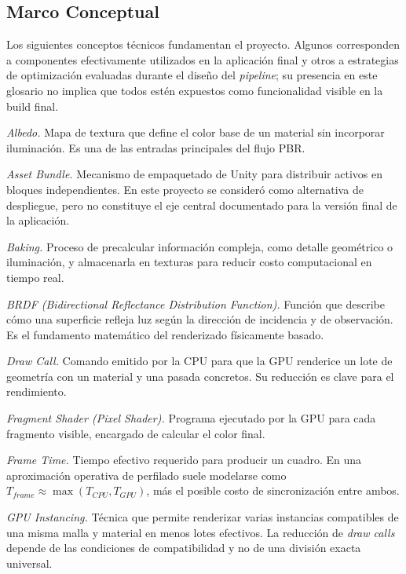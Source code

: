 \subsection{Marco Conceptual}

Los siguientes conceptos t\'ecnicos fundamentan el proyecto. Algunos corresponden a componentes efectivamente utilizados en la aplicaci\'on final y otros a estrategias de optimizaci\'on evaluadas durante el dise\~no del \textit{pipeline}; su presencia en este glosario no implica que todos est\'en expuestos como funcionalidad visible en la build final.

\textit{Albedo.} Mapa de textura que define el color base de un material sin incorporar iluminaci\'on. Es una de las entradas principales del flujo PBR.

\textit{Asset Bundle.} Mecanismo de empaquetado de Unity para distribuir activos en bloques independientes. En este proyecto se consider\'o como alternativa de despliegue, pero no constituye el eje central documentado para la versi\'on final de la aplicaci\'on.

\textit{Baking.} Proceso de precalcular informaci\'on compleja, como detalle geom\'etrico o iluminaci\'on, y almacenarla en texturas para reducir costo computacional en tiempo real.

\textit{BRDF (\textit{Bidirectional Reflectance Distribution Function}).} Funci\'on que describe c\'omo una superficie refleja luz seg\'un la direcci\'on de incidencia y de observaci\'on. Es el fundamento matem\'atico del renderizado f\'isicamente basado.

\textit{Draw Call.} Comando emitido por la CPU para que la GPU renderice un lote de geometr\'ia con un material y una pasada concretos. Su reducci\'on es clave para el rendimiento.

\textit{Fragment Shader (\textit{Pixel Shader}).} Programa ejecutado por la GPU para cada fragmento visible, encargado de calcular el color final.

\textit{Frame Time.} Tiempo efectivo requerido para producir un cuadro. En una aproximaci\'on operativa de perfilado suele modelarse como $T_{frame} \approx \max(T_{CPU}, T_{GPU})$, m\'as el posible costo de sincronizaci\'on entre ambos.

\textit{GPU Instancing.} T\'ecnica que permite renderizar varias instancias compatibles de una misma malla y material en menos lotes efectivos. La reducci\'on de \textit{draw calls} depende de las condiciones de compatibilidad y no de una divisi\'on exacta universal.

